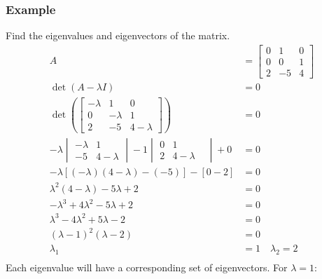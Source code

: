 \documentclass{math}
\begin{document}
\subsubsection*{Example}
Find the eigenvalues and eigenvectors of the matrix.
\begin{align*}
  A &= \begin{bmatrix}
    0 & 1 & 0 \\
    0 & 0 & 1 \\
    2 & -5 & 4
  \end{bmatrix} \\
  \det(A-\lambda I) &= 0 \\
  \det\left(\begin{bmatrix}
    -\lambda & 1 & 0 \\
    0 & -\lambda & 1 \\
    2 & -5 & 4-\lambda
  \end{bmatrix}\right) &= 0 \\
  -\lambda\begin{vmatrix}
    -\lambda & 1 \\
    -5 & 4-\lambda
  \end{vmatrix}-1\begin{vmatrix}
    0 & 1 & \\
    2 & 4-\lambda
  \end{vmatrix}+0 &= 0 \\
  -\lambda\left[(-\lambda)(4-\lambda)-(-5)\right]-\left[0-2\right] &= 0 \\
  \lambda^2(4-\lambda)-5\lambda+2 &= 0 \\
  -\lambda^3+4\lambda^2-5\lambda+2 &= 0 \\
  \lambda^3-4\lambda^2+5\lambda-2 &= 0 \\
  (\lambda-1)^2(\lambda-2) &= 0 \\
  \lambda_1 &= 1 \quad \lambda_2 = 2 \\
\end{align*}
Each eigenvalue will have a corresponding set of eigenvectors. For
\( \lambda = 1 \):
\end{document}
